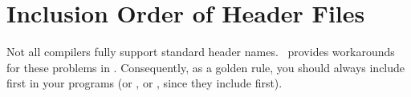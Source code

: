








\section{Inclusion Order of Header Files}
Not all compilers fully support standard header names. \cgal\ provides 
workarounds for these problems in . Consequently, as a 
golden rule, you should always include  first in your 
programs (or , or , since they 
include  first).





